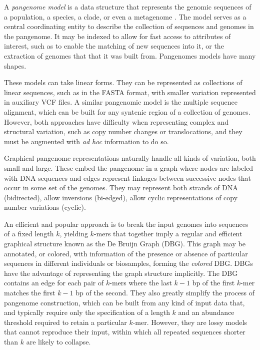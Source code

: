 A \emph{pangenome model} is a data structure that represents the genomic sequences of a population, a species, a clade, or even a metagenome \cite{computational2016computational}.
The model serves as a central coordinating entity to describe the collection of sequences and genomes in the pangenome.
It may be indexed to allow for fast access to attributes of interest, such as to enable the matching of new sequences into it, or the extraction of genomes that that it was built from.
Pangenomes models have many shapes.

These models can take linear forms.
They can be represented as collections of linear sequences, such as in the FASTA format, with smaller variation represented in auxiliary VCF files.
A similar pangenomic model is the multiple sequence alignment, which can be built for any syntenic region of a collection of genomes.
However, both approaches have difficulty when representing complex and structural variation, such as copy number changes or translocations, and they must be augmented with \emph{ad hoc} information to do so.

Graphical pangenome representations naturally handle all kinds of variation, both small and large.
These embed the pangenome in a graph where nodes are labeled with DNA sequences and edges represent linkages between successive nodes that occur in some set of the genomes.
They may represent both strands of DNA (bidirected), allow inversions (bi-edged), allow cyclic representations of copy number variations (cyclic).

An efficient and popular approach is to break the input genomes into sequences of a fixed length $k$, yielding $k$-mers that together imply a regular and efficient graphical structure known as the De Bruijn Graph (DBG).
This graph may be annotated, or colored, with information of the presence or absence of particular sequences in different individuals or biosamples, forming the \emph{colored} DBG.
DBGs have the advantage of representing the graph structure implicitly.
The DBG contains an edge for each pair of $k$-mers where the last $k-1$ bp of the first $k$-mer matches the first $k-1$ bp of the second.
They also greatly simplify the process of pangenome construction, which can be built from any kind of input data that, and typically require only the specification of a length $k$ and an abundance threshold required to retain a particular $k$-mer.
However, they are lossy models that cannot reproduce their input, within which all repeated sequences shorter than $k$ are likely to collapse.


